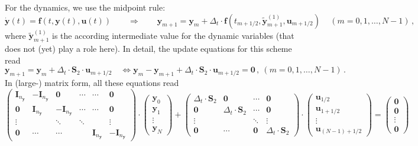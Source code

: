 \documentclass{article}
\newcommand{\vectorfont}[1]{\boldsymbol{#1}}%
\newcommand{\greekvectorfont}[1]{\boldsymbol{#1}}%
\newcommand{\matrixfont}[1]{\mathbf{#1}}%
\newcommand{\fvec}{\vectorfont{f}}
\newcommand{\uvec}{\vectorfont{u}}
\newcommand{\yvec}{\vectorfont{y}}
\newcommand{\tildeyvec}{\vectorfont{\tilde{y}}}
\newcommand{\dyvec}{\vectorfont{\dot{y}}}
\newcommand{\nullvec}{\greekvectorfont{0}}
\newcommand{\Imat}{\matrixfont{I}}%
\newcommand{\Smat}{\matrixfont{S}}
\newcommand{\Nullmat}{\matrixfont{0}}
\begin{document}
For the dynamics, we use the midpoint rule:
\[
\dyvec(t) = \fvec(t, \yvec(t), \uvec(t))\qquad\Rightarrow\qquad
\yvec_{m+1} = \yvec_{m} + \Delta_t \cdot \fvec(t_{m+1/2}, \tildeyvec_{m+1}^{(1)}, \uvec_{m+1/2})\,\quad (m=0,1,\ldots,N-1)\,,
\]
where $\tildeyvec_{m+1}^{(1)}$ is the according intermediate value for the dynamic variables (that does not (yet) play a role here).
In detail, the update equations for this scheme read
\[
\yvec_{m+1} = \yvec_m + \Delta_t \cdot \Smat_2 \cdot \uvec_{m+1/2}
\quad\Leftrightarrow
\yvec_m - \yvec_{m+1} + \Delta_t \cdot \Smat_2 \cdot \uvec_{m+1/2} = \nullvec\,,~(m = 0,1,\ldots,N-1)\,.
\]
In (large-) matrix form, all these equations read
{\small
\[
\begin{pmatrix}
\Imat_{n_{\yvec}} & -\Imat_{n_{\yvec}} & \Nullmat           & \cdots & \cdots & \Nullmat \\
\Nullmat          & \Imat_{n_{\yvec}}  & -\Imat_{n_{\yvec}} & \cdots & \cdots & \Nullmat \\
\vdots            &                    & \ddots             & \ddots &        & \vdots \\
\Nullmat          & \cdots             & \cdots             & &\Imat_{n_{\yvec}} & -\Imat_{n_{\yvec}}
\end{pmatrix}
\cdot
\begin{pmatrix}
	\yvec_0 \\ \yvec_1 \\ \vdots \\ \yvec_N
\end{pmatrix}
+
\begin{pmatrix}
	\Delta_t \cdot \Smat_2 & \Nullmat               & \cdots   & \Nullmat \\
	\Nullmat               & \Delta_t \cdot \Smat_2 & \cdots   & \Nullmat \\
	\vdots                 &                        & \ddots   & \vdots   \\
	\Nullmat               & \cdots                 & \Nullmat & \Delta_t \cdot \Smat_2
\end{pmatrix}
\cdot
\begin{pmatrix}
	\uvec_{1/2} \\ \uvec_{1+1/2} \\ \vdots \\ \uvec_{(N-1)+1/2}
\end{pmatrix}
=
\begin{pmatrix}
	\nullvec \\
	\nullvec \\
	\vdots \\
	\nullvec 
\end{pmatrix}
\]
}
\end{document}
